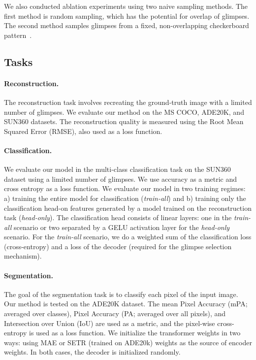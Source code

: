 \documentclass{article}
\begin{document}
We also conducted ablation experiments using two naive sampling methods. The first method is random sampling, which has the potential for overlap of glimpses. The second method samples glimpses from a fixed, non-overlapping checkerboard pattern~\cite{he2022masked}.

\subsection{Tasks}







\paragraph{Reconstruction.} The reconstruction task involves recreating the ground-truth image with a limited number of glimpses. We evaluate our method on the MS COCO, ADE20K, and SUN360 datasets. The reconstruction quality is measured using the Root Mean Squared Error (RMSE), also used as a loss function.

\paragraph{Classification.} We evaluate our model in the multi-class classification task on the SUN360 dataset using a limited number of glimpses. We use accuracy as a metric and cross entropy as a loss function. We evaluate our model in two training regimes: a) training the entire model for classification (\textit{train-all}) and b) training only the classification head-on features generated by a model trained on the reconstruction task (\textit{head-only}).
The classification head consists of linear layers: one in the \textit{train-all} scenario or two separated by a GELU activation layer for the \textit{head-only} scenario. For the \textit{train-all} scenario, we do a weighted sum of the classification loss (cross-entropy) and a loss of the decoder (required for the glimpse selection mechanism).

\paragraph{Segmentation.} The goal of the segmentation task is to classify each pixel of the input image. Our method is tested on the ADE20K dataset. The mean Pixel Accuracy (mPA; averaged over classes), Pixel Accuracy (PA; averaged over all pixels), and Intersection over Union (IoU) are used as a metric, and the pixel-wise cross-entropy is used as a loss function. We initialize the transformer weights in two ways: using MAE or SETR (trained on ADE20k) weights as the source of encoder weights. In both cases, the decoder is initialized randomly.
\end{document}

